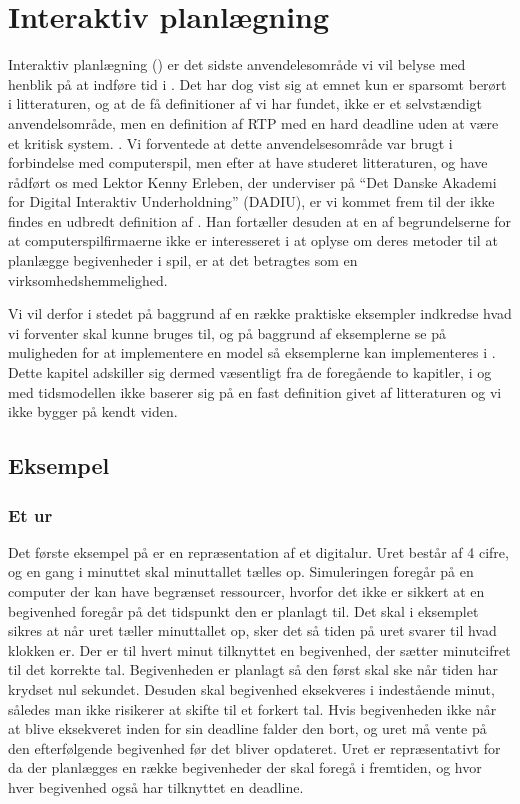 \chapter{Interaktiv planlægning}
\label{chap:is}

Interaktiv planlægning (\is) er det sidste anvendelesområde vi vil belyse med henblik på at indføre tid i \pycsp. Det har dog vist sig at emnet kun er sparsomt berørt i litteraturen, og at de få definitioner af \is vi har fundet, ikke er et selvstændigt anvendelsområde, men en definition af RTP med en hard deadline uden at være et kritisk system. \cite{?}. Vi forventede at dette anvendelsesområde var brugt i forbindelse med computerspil, men efter at have studeret litteraturen, og have rådført os med Lektor Kenny Erleben, der underviser på  ``Det Danske Akademi for Digital Interaktiv Underholdning'' (DADIU), er vi kommet frem til der ikke findes en udbredt definition af \is. Han fortæller desuden at en af begrundelserne for at computerspilfirmaerne ikke er interesseret i at oplyse om deres metoder til at planlægge begivenheder i spil, er at det  betragtes som en  virksomhedshemmelighed. 

Vi vil derfor i stedet på baggrund af en række praktiske eksempler indkredse hvad vi forventer \is skal kunne bruges til, og på baggrund af eksemplerne se på muligheden for at implementere en model så eksemplerne kan implementeres i \pycsp. Dette kapitel adskiller sig dermed væsentligt fra de foregående to kapitler, i og med tidsmodellen ikke baserer sig på en fast definition givet af litteraturen og vi ikke bygger på kendt viden.

\section{Eksempel}

\subsection{Et ur}
Det første eksempel på \is er en repræsentation af et digitalur. Uret består af 4 cifre, og en gang i minuttet skal minuttallet tælles op. Simuleringen foregår på en computer der kan have begrænset ressourcer, hvorfor det ikke er sikkert at en begivenhed foregår på det tidspunkt den er planlagt til.  Det skal i eksemplet sikres at når uret tæller minuttallet op, sker det så tiden på uret svarer til hvad klokken er. Der er til hvert minut tilknyttet en begivenhed, der sætter minutcifret til det korrekte tal. Begivenheden er planlagt så den først skal ske når tiden har krydset nul sekundet. Desuden skal begivenhed eksekveres i indestående minut, således man ikke risikerer at skifte til et forkert tal. Hvis begivenheden ikke når at blive eksekveret inden for sin deadline falder den bort, og uret må vente på den efterfølgende begivenhed før det bliver opdateret.
Uret er repræsentativt for \is da der planlægges en række begivenheder der skal foregå i fremtiden, og hvor hver begivenhed også har tilknyttet en deadline.

